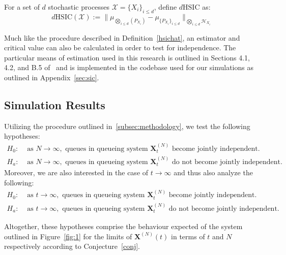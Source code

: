 \begin{definition}[$d$HSIC]

    \label{dhsic}
    For a set of $d$ stochastic processes $\mathcal{X} = \{X_{i}\}_{i \leq d}$, define $d\text{HSIC}$ as:
    \[d\text{HSIC}(\mathcal{X}) := \|\mu_{\bigotimes_{i \leq d}(P_{X_{i}})} - \mu_{\{P_{X_{i}}\}_{i \leq d}}\|_{\bigotimes_{i \leq d}\mathcal{H}_{X_{i}}}\]
\end{definition}

Much like the procedure described in Definition~\ref{hsichat}, an estimator and critical value can also be calculated in order to test for independence.
The particular means of estimation used in this research is outlined in Sections 4.1, 4.2, and B.5 of~\cite{jointindep} and is
implemented in the codebase used for our simulations as outlined in Appendix~\ref{sec:sic}.

\subsection{Simulation Results}\label{subsec:simulation-results}
Utilizing the procedure outlined in~\ref{subsec:methodology}, we test the following hypotheses:
\begin{align*}
    \label{set 2}
    H_{0}:& \text{ as } N\rightarrow \infty, \text{ queues in queueing system } \mathbf{X}_{t}^{(N)} \text{ become jointly independent.}  \\
    H_{a}:& \text{ as } N\rightarrow \infty, \text{ queues in queueing system } \mathbf{X}_{t}^{(N)} \text{ do not become jointly independent.}
\end{align*}
Moreover, we are also interested in the case of $t \rightarrow \infty$ and thus also analyze the following:
\begin{align*}
    \label{set 1}
    H_{0}:& \text{ as } t\rightarrow \infty, \text{ queues in queueing system } \mathbf{X}_{t}^{(N)} \text{ become jointly independent.}  \\
    H_{a}:& \text{ as } t\rightarrow \infty, \text{ queues in queueing system } \mathbf{X}_{t}^{(N)} \text{ do not become jointly independent.}
\end{align*}

Altogether, these hypotheses comprise the behaviour expected of the system outlined in Figure~\ref{fig:1} for the limits of $\mathbf{X}^{(N)}(t)$
in terms of $t$ and $N$ respectively according to Conjecture~\ref{conj}.

